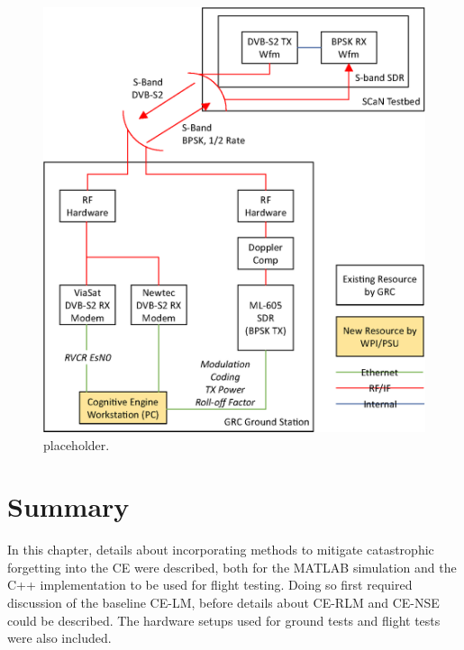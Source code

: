 \begin{figure}[ht]
\includegraphics{figures/system_block_diagram.eps}
\caption{placeholder.}\label{methods:flightTestFig}
\end{figure} 

\section{Summary}
\par In this chapter, details about incorporating methods to mitigate catastrophic forgetting into the CE were described, both for the MATLAB simulation and the C++ implementation to be used for flight testing. Doing so first required discussion of the baseline CE-LM, before details about CE-RLM and CE-NSE could be described. The hardware setups used for ground tests and flight tests were also included.